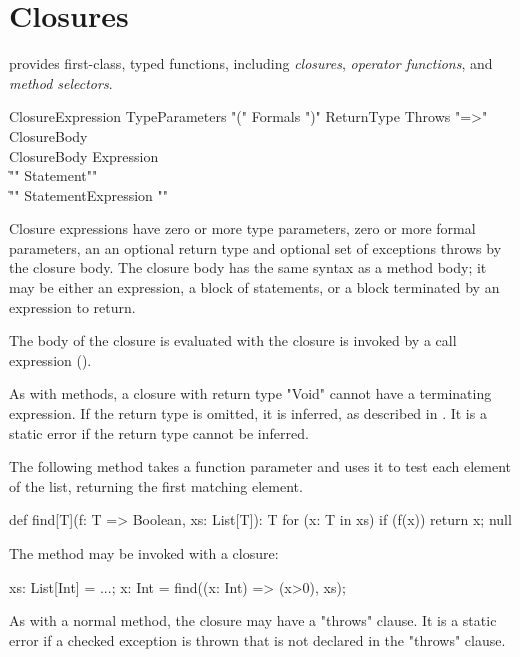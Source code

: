 \section{Closures}
\label{Closures}

\Xten{} provides first-class, typed functions, including
\emph{closures},
\emph{operator functions},
and \emph{method selectors}.

\begin{grammar}
ClosureExpression \:
        TypeParameters\opt
        \xcd"("
        Formals\opt
        \xcd")"
        ReturnType\opt
        Throws\opt
        \xcd"=>" ClosureBody \\
ClosureBody \:
        Expression \\
        \| \xcd"{" Statement\star \xcd"}" \\
        \| \xcd"{" Statement\star Expression \xcd"}" \\
\end{grammar}

Closure expressions have zero or more type parameters,
zero or more formal parameters, an an optional return type and
optional set of exceptions throws by the closure body.  The
closure body has the same syntax as a method body; it may be
either an expression, a block of statements, or a block
terminated by an expression to return.

The body of the closure is evaluated with the closure is
invoked by a call expression ().

As with methods, a closure with return type \xcd"Void" cannot
have a terminating expression. 
If the return type is omitted, it is inferred, as described in
.
It is a static error if the return type cannot be inferred.

\begin{example}
The following method takes a function parameter and uses it to
test each element of the list, returning the first matching
element.
\begin{xten}
def find[T](f: T => Boolean, xs: List[T]): T {
  for (x: T in xs)
    if (f(x)) return x;
  null
}
\end{xten}

The method may be invoked with a closure:
\begin{xten}
xs: List[Int] = ...;
x: Int = find((x: Int) => (x>0), xs);
\end{xten}
\end{example}

As with a normal method, the closure may have a \xcd"throws" clause. It is a
static error if a checked exception is thrown that is not declared in
the \xcd"throws" clause.

